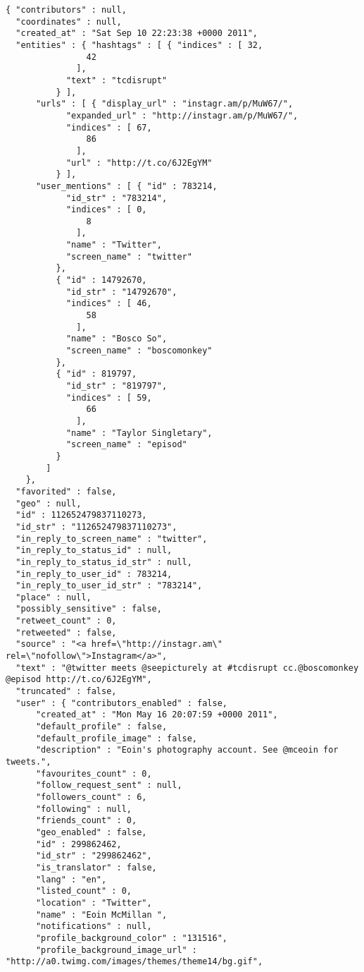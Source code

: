 \begin{lstlisting}[caption=An example Twitter Streaming API response, label=lst:streamingapi]
{ "contributors" : null,
  "coordinates" : null,
  "created_at" : "Sat Sep 10 22:23:38 +0000 2011",
  "entities" : { "hashtags" : [ { "indices" : [ 32,
                42
              ],
            "text" : "tcdisrupt"
          } ],
      "urls" : [ { "display_url" : "instagr.am/p/MuW67/",
            "expanded_url" : "http://instagr.am/p/MuW67/",
            "indices" : [ 67,
                86
              ],
            "url" : "http://t.co/6J2EgYM"
          } ],
      "user_mentions" : [ { "id" : 783214,
            "id_str" : "783214",
            "indices" : [ 0,
                8
              ],
            "name" : "Twitter",
            "screen_name" : "twitter"
          },
          { "id" : 14792670,
            "id_str" : "14792670",
            "indices" : [ 46,
                58
              ],
            "name" : "Bosco So",
            "screen_name" : "boscomonkey"
          },
          { "id" : 819797,
            "id_str" : "819797",
            "indices" : [ 59,
                66
              ],
            "name" : "Taylor Singletary",
            "screen_name" : "episod"
          }
        ]
    },
  "favorited" : false,
  "geo" : null,
  "id" : 112652479837110273,
  "id_str" : "112652479837110273",
  "in_reply_to_screen_name" : "twitter",
  "in_reply_to_status_id" : null,
  "in_reply_to_status_id_str" : null,
  "in_reply_to_user_id" : 783214,
  "in_reply_to_user_id_str" : "783214",
  "place" : null,
  "possibly_sensitive" : false,
  "retweet_count" : 0,
  "retweeted" : false,
  "source" : "<a href=\"http://instagr.am\" rel=\"nofollow\">Instagram</a>",
  "text" : "@twitter meets @seepicturely at #tcdisrupt cc.@boscomonkey @episod http://t.co/6J2EgYM",
  "truncated" : false,
  "user" : { "contributors_enabled" : false,
      "created_at" : "Mon May 16 20:07:59 +0000 2011",
      "default_profile" : false,
      "default_profile_image" : false,
      "description" : "Eoin's photography account. See @mceoin for tweets.",
      "favourites_count" : 0,
      "follow_request_sent" : null,
      "followers_count" : 6,
      "following" : null,
      "friends_count" : 0,
      "geo_enabled" : false,
      "id" : 299862462,
      "id_str" : "299862462",
      "is_translator" : false,
      "lang" : "en",
      "listed_count" : 0,
      "location" : "Twitter",
      "name" : "Eoin McMillan ",
      "notifications" : null,
      "profile_background_color" : "131516",
      "profile_background_image_url" : "http://a0.twimg.com/images/themes/theme14/bg.gif",

\end{lstlisting}
